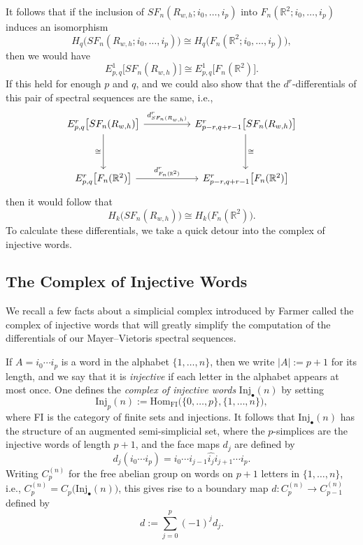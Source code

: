 \documentclass[pagebackref,colorlinks,citecolor=blue,linkcolor=blue,urlcolor=blue,filecolor=blue]{article}
\theoremstyle{definition}\newtheorem{definition}[thm]{Definition}
\theoremstyle{definition}
\newcommand{\R}{\ensuremath{\mathbb{R}}}
\begin{document}
It follows that if the inclusion of $SF_{n}(R_{w,h};  i_{0}, \dots, i_{p})$ into $F_{n}(\R^{2};  i_{0}, \dots, i_{p})$ induces an isomorphism
\[
H_{q}\big(SF_{n}(R_{w,h};  i_{0}, \dots, i_{p})\big)\cong H_{q}\big(F_{n}(\R^{2};  i_{0}, \dots, i_{p})\big),
\]
then we would have 
\[
E^{1}_{p,q}\big[SF_{n}(R_{w,h})\big]
\cong E^{1}_{p,q}\big[F_{n}(\R^{2})\big].
\]
If this held for enough $p$ and $q$, and we could also show that the $d^{r}$-differentials of this pair of spectral sequences are the same, i.e., 
\[\begin{tikzcd}
	{E^{r}_{p,q}\big[SF_{n}(R_{w,h})\big]} && {E^{r}_{p-r,q+r-1}\big[SF_{n}(R_{w,h})\big]} \\
	\\
	{E^{r}_{p,q}\big[F_{n}(\R^{2})\big]} && {E^{r}_{p-r,q+r-1}\big[F_{n}(\R^{2})\big]}
	\arrow["{d^{r}_{SF_{n}(R_{w,h})}}", from=1-1, to=1-3]
	\arrow["\cong"', from=1-1, to=3-1]
	\arrow["\cong", from=1-3, to=3-3]
	\arrow["{d^{r}_{F_{n}(\R^{2})}}", from=3-1, to=3-3]
\end{tikzcd}\]
then it would follow that
\[
H_{k}\big(SF_{n}(R_{w,h})\big)\cong H_{k}\big(F_{n}(\R^{2})\big).
\]
To calculate these differentials, we take a quick detour into the complex of injective words.

\subsection{The Complex of Injective Words}
We recall a few facts about a simplicial complex introduced by Farmer \cite{farmer1978cellular} called the complex of injective words that will greatly simplify the computation of the differentials of our Mayer--Vietoris spectral sequences. 

If $A=i_{0}\cdots i_{p}$ is a word in the alphabet $\{1,\dots, n\}$, then we write $|A|:=p+1$ for its length, and we say that it is \emph{injective} if each letter in the alphabet appears at most once.
One defines the \emph{complex of injective words} $\text{Inj}_{\bullet}(n)$ by setting
\[
\text{Inj}_{p}(n):=\text{Hom}_{\text{FI}}\big(\{0,\dots, p\},\{1,\dots, n\}\big),
\]
where FI is the category of finite sets and injections.
It follows that $\text{Inj}_{\bullet}(n)$ has the structure of an augmented semi-simplicial set, where the $p$-simplices are the injective words of length $p+1$, and the face maps $d_{j}$ are defined by
\[
d_{j}(i_{0}\cdots i_{p})=i_{0}\cdots i_{j-1}\widehat{i_{j}}i_{j+1}\cdots i_{p}.
\]
Writing $C^{(n)}_{p}$ for the free abelian group on words on $p+1$ letters in $\{1,\dots, n\}$, i.e., $C^{(n)}_{p}=C_{p}\big(\text{Inj}_{\bullet}(n)\big)$, this gives rise to a boundary map $d:C^{(n)}_{p}\to C^{(n)}_{p-1}$ defined by 
\[
d:=\sum_{j=0}^{p}(-1)^{j}d_{j}.
\]
\end{document}
